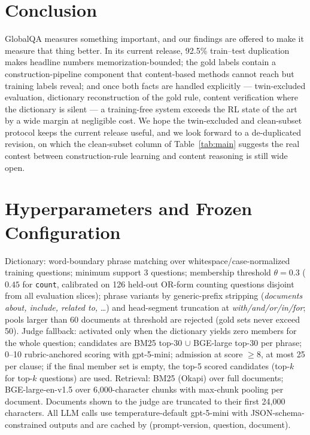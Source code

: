 \documentclass[11pt]{article}
\begin{document}
\section{Conclusion}

GlobalQA measures something important, and our findings are offered to make it measure that thing better. In its current release, 92.5\% train--test duplication makes headline numbers memorization-bounded; the gold labels contain a construction-pipeline component that content-based methods cannot reach but training labels reveal; and once both facts are handled explicitly --- twin-excluded evaluation, dictionary reconstruction of the gold rule, content verification where the dictionary is silent --- a training-free system exceeds the RL state of the art by a wide margin at negligible cost. We hope the twin-excluded and clean-subset protocol keeps the current release useful, and we look forward to a de-duplicated revision, on which the clean-subset column of Table~\ref{tab:main} suggests the real contest between construction-rule learning and content reasoning is still wide open.

\appendix

\section{Hyperparameters and Frozen Configuration}
\label{app:hyper}

Dictionary: word-boundary phrase matching over whitespace/case-normalized training questions; minimum support 3 questions; membership threshold $\theta{=}0.3$ ($0.45$ for \texttt{count}, calibrated on 126 held-out OR-form counting questions disjoint from all evaluation slices); phrase variants by generic-prefix stripping (\emph{documents about, include, related to,} \ldots) and head-segment truncation at \emph{with/and/or/in/for}; pools larger than 60 documents at threshold are rejected (gold sets never exceed 50). Judge fallback: activated only when the dictionary yields zero members for the whole question; candidates are BM25 top-30 $\cup$ BGE-large top-30 per phrase; 0--10 rubric-anchored scoring with gpt-5-mini; admission at score $\geq 8$, at most 25 per clause; if the final member set is empty, the top-5 scored candidates (top-$k$ for top-$k$ questions) are used. Retrieval: BM25 (Okapi) \cite{bm25} over full documents; BGE-large-en-v1.5 \cite{bge} over 6{,}000-character chunks with max-chunk pooling per document. Documents shown to the judge are truncated to their first 24{,}000 characters. All LLM calls use temperature-default gpt-5-mini with JSON-schema-constrained outputs and are cached by (prompt-version, question, document).
\end{document}
